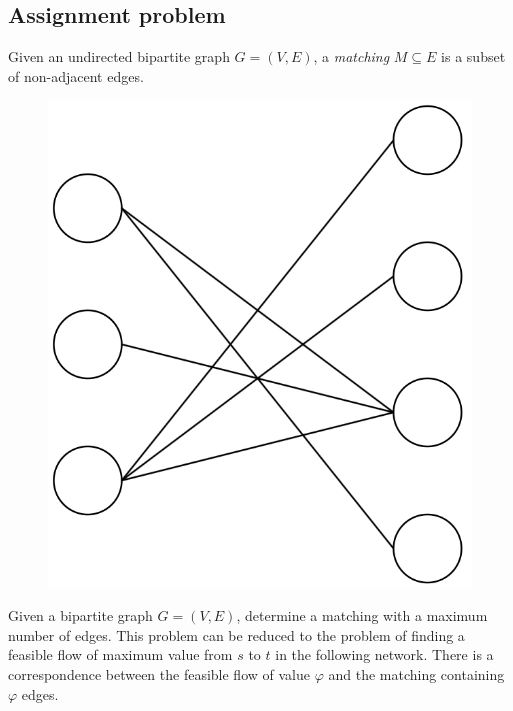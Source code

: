 \subsection*{Assignment problem}
\begin{definition}
    Given an undirected bipartite graph $G=(V,E)$, a \emph{matching} $M \subseteq E$ is a subset of non-adjacent edges. 
\end{definition}
\begin{figure}[H]
    \centering
    \includegraphics[width=0.2\linewidth]{images/matching.png}
\end{figure}
Given a bipartite graph $G=(V,E)$, determine a matching with a maximum number of edges. 
This problem can be reduced to the problem of finding a feasible flow of maximum value from $s$ to $t$ in the following network. 
There is a correspondence between the feasible flow of value $\varphi$ and the matching containing $\varphi$ edges. 